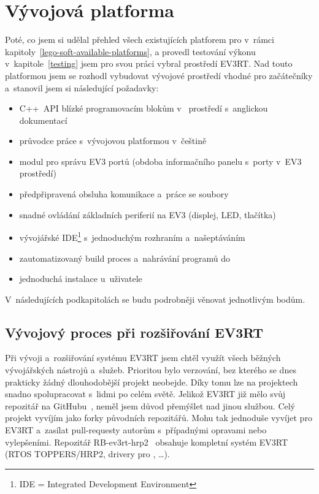 \chapter{Vývojová platforma}

Poté, co jsem si udělal přehled všech existujících platforem pro \legoEV{} v~rámci kapitoly~\ref{lego-soft-available-platforms}, a provedl testování výkonu v~kapitole~\ref{testing} jsem pro svou práci vybral prostředí EV3RT.
Nad touto platformou jsem se rozhodl vybudovat vývojové prostředí vhodné pro začátečníky a~stanovil jsem si následující požadavky:

\begin{itemize}
\item C++~API blízké programovacím blokům v~\lego{} prostředí s~anglickou dokumentací
\item průvodce práce s~vývojovou platformou v~češtině
\item modul pro správu EV3 portů (obdoba informačního panelu s~porty v~EV3 prostředí)  
\item předpřipravená obsluha komunikace a~práce se soubory
\item snadné ovládání základních periferií na EV3 (displej, LED, tlačítka)
\item vývojářské IDE\footnote{IDE = Integrated Development Environment} s~jednoduchým rozhraním a~našeptáváním 
\item zautomatizovaný build proces a~nahrávání programů do 
\item jednoduchá instalace u~uživatele
\end{itemize}
V~následujících podkapitolách se budu podrobněji věnovat jednotlivým bodům.


\section{Vývojový proces při rozšiřování EV3RT}

Při vývoji a~rozšiřování systému EV3RT jsem chtěl využít všech běžných vývojářských nástrojů a~služeb.
Prioritou bylo verzování, bez kterého se dnes prakticky žádný dlouhodobější projekt neobejde. Díky tomu lze na projektech snadno spolupracovat s~lidmi po celém světě.
Jelikož EV3RT již mělo svůj repozitář na GitHubu~\cite{legoProgramingPlatform_EV3RT-github}, neměl jsem důvod přemýšlet nad jinou službou.
Celý projekt vyvíjím jako forky původních repozitářů. Mohu tak jednoduše vyvíjet pro EV3RT a~zasílat pull-requesty autorům s~případnými opravami nebo vylepšeními.
Repozitář RB-ev3rt-hrp2~\cite{RB-ev3rt-hrp2-github} obsahuje kompletní systém EV3RT (RTOS TOPPERS/HRP2, drivery pro \brick{}, \dots). 

